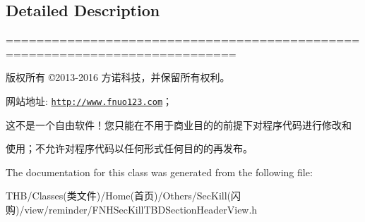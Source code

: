 \subsection{Detailed Description}
============================================================================

版权所有 ©2013-\/2016 方诺科技，并保留所有权利。

网站地址\+: \href{http://www.fnuo123.com}{\tt http\+://www.\+fnuo123.\+com}； 



这不是一个自由软件！您只能在不用于商业目的的前提下对程序代码进行修改和

使用；不允许对程序代码以任何形式任何目的的再发布。 

 

The documentation for this class was generated from the following file\+:\begin{DoxyCompactItemize}
\item 
T\+H\+B/\+Classes(类文件)/\+Home(首页)/\+Others/\+Sec\+Kill(闪购)/view/reminder/F\+N\+H\+Sec\+Kill\+T\+B\+D\+Section\+Header\+View.\+h\end{DoxyCompactItemize}
